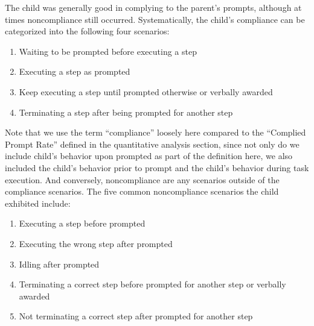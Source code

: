 The child was generally good in complying to the parent's prompts, although at times noncompliance still occurred.  Systematically, the child's compliance can be categorized into the following four scenarios:
\begin{enumerate}
	\item Waiting to be prompted before executing a step
	\item Executing a step as prompted
	\item Keep executing a step until prompted otherwise or verbally awarded
	\item Terminating a step after being prompted for another step
\end{enumerate}
Note that we use the term ``compliance'' loosely here compared to the ``Complied Prompt Rate'' defined in the quantitative analysis section, since not only do we include child's behavior upon prompted as part of the definition here, we also included the child's behavior prior to prompt and the child's behavior during task execution.  And conversely, noncompliance are any scenarios outside of the compliance scenarios.  The five common noncompliance scenarios the child exhibited include:
\label{List:NoncopmlianceBehaviors}
\begin{enumerate}
	\item Executing a step before prompted
	\item Executing the wrong step after prompted
	\item Idling after prompted
	\item Terminating a correct step before prompted for another step or verbally awarded
	\item Not terminating a correct step after prompted for another step
\end{enumerate}

